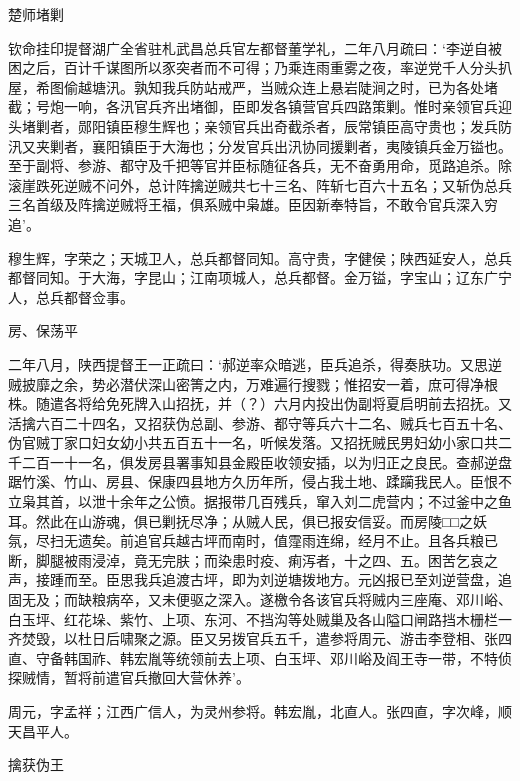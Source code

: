 \documentclass[]{article}
\begin{document}
楚师堵剿

钦命挂印提督湖广全省驻札武昌总兵官左都督董学礼，二年八月疏曰：`李逆自被困之后，百计千谋图所以豕突者而不可得；乃乘连雨重雾之夜，率逆党千人分头扒屋，希图偷越塘汛。孰知我兵防站戒严，当贼众连上悬岩陡涧之时，已为各处堵截；号炮一响，各汛官兵齐出堵御，臣即发各镇营官兵四路策剿。惟时亲领官兵迎头堵剿者，郧阳镇臣穆生辉也；亲领官兵出奇截杀者，辰常镇臣高守贵也；发兵防汛又夹剿者，襄阳镇臣于大海也；分发官兵出汛协同援剿者，夷陵镇兵金万镒也。至于副将、参游、都守及千把等官并臣标随征各兵，无不奋勇用命，觅路追杀。除滚崖跌死逆贼不问外，总计阵擒逆贼共七十三名、阵斩七百六十五名；又斩伪总兵三名首级及阵擒逆贼将王福，俱系贼中枭雄。臣因新奉特旨，不敢令官兵深入穷追'。

穆生辉，字荣之；天城卫人，总兵都督同知。高守贵，字健侯；陕西延安人，总兵都督同知。于大海，字昆山；江南项城人，总兵都督。金万镒，字宝山；辽东广宁人，总兵都督佥事。

房、保荡平

二年八月，陕西提督王一正疏曰：`郝逆率众暗逃，臣兵追杀，得奏肤功。又思逆贼披靡之余，势必潜伏深山密箐之内，万难遍行搜戮；惟招安一着，庶可得净根株。随遣各将给免死牌入山招抚，并（？）六月内投出伪副将夏启明前去招抚。又活擒六百二十四名，又招获伪总副、参游、都守等兵六十二名、贼兵七百五十名、伪官贼丁家口妇女幼小共五百五十一名，听候发落。又招抚贼民男妇幼小家口共二千二百一十一名，俱发房县署事知县金殿臣收领安插，以为归正之良民。查郝逆盘踞竹溪、竹山、房县、保康四县地方久历年所，侵占我土地、蹂躏我民人。臣恨不立枭其首，以泄十余年之公愤。据报带几百残兵，窜入刘二虎营内；不过釜中之鱼耳。然此在山游魂，俱已剿抚尽净；从贼人民，俱已报安信妥。而房陵□□之妖氛，尽扫无遗矣。前追官兵越古坪而南时，值霪雨连绵，经月不止。且各兵粮已断，脚腿被雨浸淖，竟无完肤；而染患时疫、痢泻者，十之四、五。困苦乞哀之声，接踵而至。臣思我兵追渡古坪，即为刘逆塘拨地方。元凶报已至刘逆营盘，追固无及；而缺粮病卒，又未便驱之深入。遂檄令各该官兵将贼内三座庵、邓川峪、白玉坪、红花垛、紫竹、上项、东河、不挡沟等处贼巢及各山隘口闸路挡木栅栏一齐焚毁，以杜日后啸聚之源。臣又另拨官兵五千，遣参将周元、游击李登相、张四直、守备韩国祚、韩宏胤等统领前去上项、白玉坪、邓川峪及阎王寺一带，不特侦探贼情，暂将前遣官兵撤回大营休养'。

周元，字孟祥；江西广信人，为灵州参将。韩宏胤，北直人。张四直，字次峰，顺天昌平人。

擒获伪王
\end{document}
